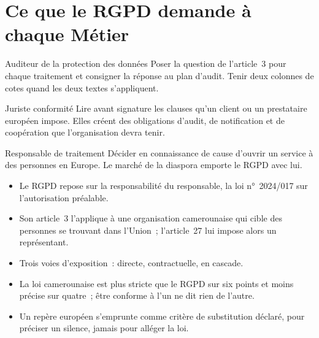 \section{Ce que le RGPD demande à chaque Métier}
\label{sec:c04-metiers}

\begin{boxmetier}{Auditeur de la protection des données}
Poser la question de l'article~3 pour chaque traitement et consigner la
réponse au plan d'audit. Tenir deux colonnes de cotes quand les deux textes
s'appliquent.
\end{boxmetier}

\begin{boxmetier}{Juriste conformité}
Lire avant signature les clauses qu'un client ou un prestataire européen
impose. Elles créent des obligations d'audit, de notification et de
coopération que l'organisation devra tenir.
\end{boxmetier}

\begin{boxmetier}{Responsable de traitement}
Décider en connaissance de cause d'ouvrir un service à des personnes en
Europe. Le marché de la diaspora emporte le RGPD avec lui.
\end{boxmetier}

\begin{boxresume}
\begin{itemize}
    \item Le RGPD repose sur la responsabilité du responsable, la loi
          n°~2024/017 sur l'autorisation préalable.
    \item Son article~3 l'applique à une organisation camerounaise qui cible
          des personnes se trouvant dans l'Union~; l'article~27 lui impose
          alors un représentant.
    \item Trois voies d'exposition~: directe, contractuelle, en cascade.
    \item La loi camerounaise est plus stricte que le RGPD sur six points et
          moins précise sur quatre~; être conforme à l'un ne dit rien de
          l'autre.
    \item Un repère européen s'emprunte comme critère de substitution
          déclaré, pour préciser un silence, jamais pour alléger la loi.
\end{itemize}
\end{boxresume}

